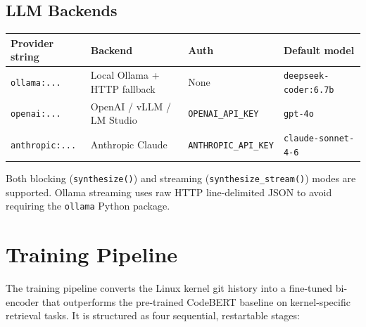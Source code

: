 \documentclass[11pt,a4paper]{article}
\begin{document}
\subsection{LLM Backends}

\begin{center}
\begin{tabular}{@{}llll@{}}
\toprule
\textbf{Provider string} & \textbf{Backend} & \textbf{Auth} & \textbf{Default model} \\
\midrule
\texttt{ollama:...} & Local Ollama + HTTP fallback & None & \texttt{deepseek-coder:6.7b} \\
\texttt{openai:...} & OpenAI / vLLM / LM Studio & \texttt{OPENAI\_API\_KEY} & \texttt{gpt-4o} \\
\texttt{anthropic:...} & Anthropic Claude & \texttt{ANTHROPIC\_API\_KEY} & \texttt{claude-sonnet-4-6} \\
\bottomrule
\end{tabular}
\end{center}

Both blocking (\texttt{synthesize()}) and streaming
(\texttt{synthesize\_stream()}) modes are supported. Ollama streaming uses
raw HTTP line-delimited JSON to avoid requiring the \texttt{ollama} Python
package.

\section{Training Pipeline}
\label{sec:training}

The training pipeline converts the Linux kernel git history into a fine-tuned
bi-encoder that outperforms the pre-trained CodeBERT baseline on
kernel-specific retrieval tasks. It is structured as four sequential,
restartable stages:
\end{document}
